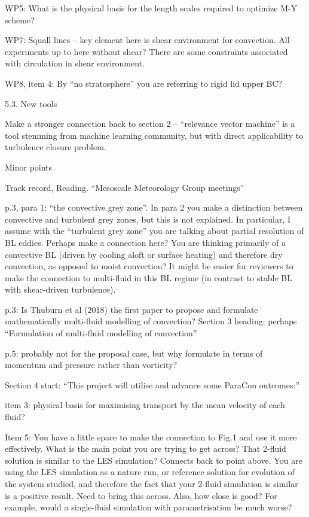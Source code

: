 \documentclass[11pt,a4paper]{article}
\begin{document}
{{\color{blue}
WP5: What is the physical basis for the length scales required to optimize M-Y scheme? }

WP7: Squall lines – key element here is shear environment for convection. All experiments up to here without shear? There are some constraints associated with circulation in shear environment. 

WP8, item 4: By “no stratosphere” you are referring to rigid lid upper BC? 

5.3. New tools 

{\color{blue}
Make a stronger connection back to section 2 –  “relevance vector machine” is a tool stemming from machine learning community, but with direct applicability to turbulence closure problem. }

Minor points 

{\color{blue}
Track record, Reading. “Mesoscale Meteorology Group meetings” }

p.3, para 1: “the convective grey zone”. In para 2 you make a distinction between convective and turbulent grey zones, but this is not explained. In particular, I assume with the “turbulent grey zone” you are talking about partial resolution of BL eddies. Perhaps make a connection here? You are thinking primarily of a convective BL (driven by cooling aloft or surface heating) and therefore dry convection, as opposed to moist convection? It might be easier for reviewers to make the connection to multi-fluid in this BL regime (in contrast to stable BL with shear-driven turbulence). 

{\color{blue}
p.3: Is Thuburn et al (2018) the first paper to propose and formulate mathematically multi-fluid modelling of convection? 
Section 3 heading: perhaps “Formulation of multi-fluid modelling of convection”  }

{\color{blue}
p.5: probably not for the proposal case, but why formulate in terms of momentum and pressure rather than vorticity? }

{\color{blue}
Section 4 start: “This project will utilise and advance some ParaCon outcomes:” }

{\color{blue}
item 3: physical basis for maximising transport by the mean velocity of each fluid? }

Item 5: You have a little space to make the connection to Fig.1 and use it more effectively. What is the main point you are trying to get across? That 2-fluid solution is similar to the LES simulation? Connects back to point above. You are using the LES simulation as a nature run, or reference solution for evolution of the system studied, and therefore the fact that your 2-fluid simulation is similar is a positive result. Need to bring this across. Also, how close is good? For example, would a single-fluid simulation with parametrisation be much worse? 

}
\end{document}
